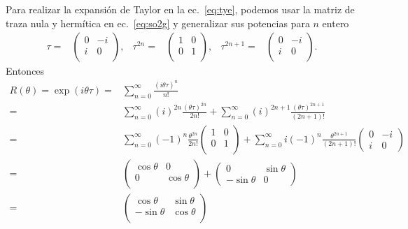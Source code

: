 Para realizar la expansión de Taylor en la ec.~\eqref{eq:tye}, podemos usar la matriz de traza nula y hermítica en ec.~\eqref{eq:so2g} y generalizar sus potencias para $n$ entero
\begin{align*}
  \tau=&
  \begin{pmatrix}
   0 &-i\\ %
   i &0\\  %
  \end{pmatrix},&\tau^{2n}=&  \begin{pmatrix}
   1 &0\\
   0 &1\\ 
  \end{pmatrix},&\tau^{2n+1}=&  \begin{pmatrix}
   0 &-i\\
   i &0\\ 
  \end{pmatrix}.
\end{align*}
Entonces
\begin{align}
\label{eq:so2}
  R(\theta)=\exp \left( i \theta\tau \right)=&\sum_{n=0}^{\infty}\frac{\left(i \theta\tau \right)^{n}}{n!}\nonumber\\
=&\sum_{n=0}^{\infty}(i)^{2n}\frac{\left( \theta\tau \right)^{2n}}{2n!}+\sum_{n=0}^{\infty}(i)^{2n+1}\frac{\left( \theta\tau \right)^{2n+1}}{(2n+1)!}\nonumber\\
  =&\sum_{n=0}^{\infty}(-1)^{n}\frac{\theta^{2n}}{2n!}
  \begin{pmatrix}
    1 & 0\\
    0 & 1\\
  \end{pmatrix}
+\sum_{n=0}^{\infty}i(-1)^{n}\frac{ \theta^{2n+1}}{(2n+1)!}
\begin{pmatrix}
  0 & -i \\
  i & 0
\end{pmatrix}
\nonumber\\
    =&
  \begin{pmatrix}
    \cos\theta & 0\\
    0 & \cos\theta \\
  \end{pmatrix}
+
\begin{pmatrix}
  0 & \sin\theta \\
  -\sin\theta & 0
\end{pmatrix}
\nonumber\\
    =&
  \begin{pmatrix}
    \cos\theta & \sin\theta\\
     -\sin\theta& \cos\theta \\
  \end{pmatrix}
\end{align}
